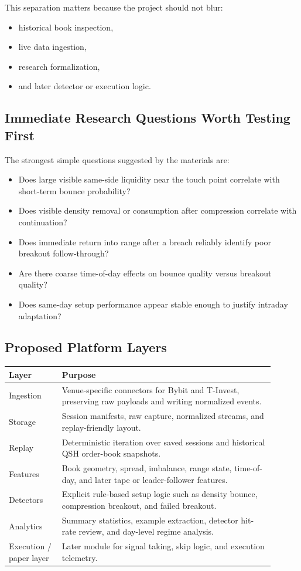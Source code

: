 This separation matters because the project should not blur:
\begin{itemize}
  \item historical book inspection,
  \item live data ingestion,
  \item research formalization,
  \item and later detector or execution logic.
\end{itemize}

\subsection{Immediate Research Questions Worth Testing First}

The strongest simple questions suggested by the materials are:
\begin{itemize}
  \item Does large visible same-side liquidity near the touch point correlate with short-term bounce probability?
  \item Does visible density removal or consumption after compression correlate with continuation?
  \item Does immediate return into range after a breach reliably identify poor breakout follow-through?
  \item Are there coarse time-of-day effects on bounce quality versus breakout quality?
  \item Does same-day setup performance appear stable enough to justify intraday adaptation?
\end{itemize}

\subsection{Proposed Platform Layers}

\begin{longtable}{p{0.18\linewidth}p{0.72\linewidth}}
\toprule
\textbf{Layer} & \textbf{Purpose} \\
\midrule
Ingestion & Venue-specific connectors for Bybit and T-Invest, preserving raw payloads and writing normalized events. \\
Storage & Session manifests, raw capture, normalized streams, and replay-friendly layout. \\
Replay & Deterministic iteration over saved sessions and historical QSH order-book snapshots. \\
Features & Book geometry, spread, imbalance, range state, time-of-day, and later tape or leader-follower features. \\
Detectors & Explicit rule-based setup logic such as density bounce, compression breakout, and failed breakout. \\
Analytics & Summary statistics, example extraction, detector hit-rate review, and day-level regime analysis. \\
Execution / paper layer & Later module for signal taking, skip logic, and execution telemetry. \\
\bottomrule
\end{longtable}

